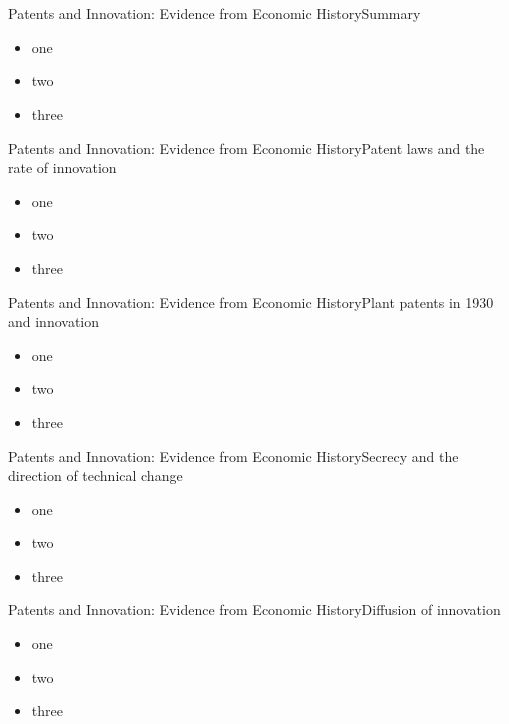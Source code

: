 \documentclass{beamer}
\begin{document}
\section{\cite{Moser2013}}
\begin{frame}{Patents and Innovation: Evidence from Economic History}{Summary}
\begin{itemize}
\item<1->{one}
\item<2->{two}
\item<3->{three}
\end{itemize}
\end{frame}

\begin{frame}{Patents and Innovation: Evidence from Economic History}{Patent laws and the rate of innovation}
\begin{itemize}
\item<1->{one}
\item<2->{two}
\item<3->{three}
\end{itemize}
\end{frame}

\begin{frame}{Patents and Innovation: Evidence from Economic History}{Plant patents in 1930 and innovation}
\begin{itemize}
\item<1->{one}
\item<2->{two}
\item<3->{three}
\end{itemize}
\end{frame}

\begin{frame}{Patents and Innovation: Evidence from Economic History}{Secrecy and the direction of technical change}
\begin{itemize}
\item<1->{one}
\item<2->{two}
\item<3->{three}
\end{itemize}
\end{frame}

\begin{frame}{Patents and Innovation: Evidence from Economic History}{Diffusion of innovation}
\begin{itemize}
\item<1->{one}
\item<2->{two}
\item<3->{three}
\end{itemize}
\end{frame}
\end{document}

